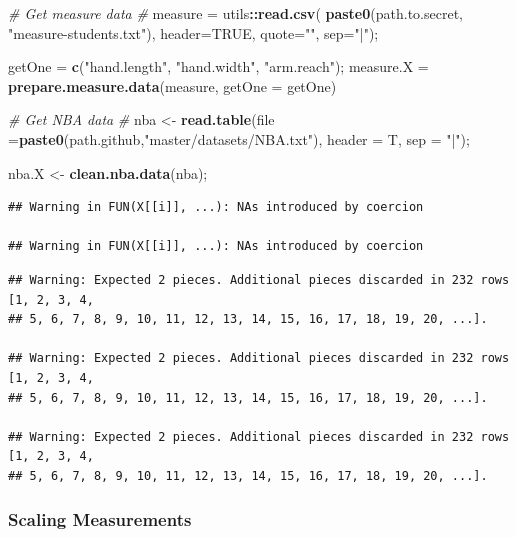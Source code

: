 \documentclass[]{article}
\newenvironment{Shaded}{\begin{snugshade}}{\end{snugshade}}
\newcommand{\CommentTok}[1]{\textcolor[rgb]{0.56,0.35,0.01}{\textit{#1}}}
\newcommand{\DataTypeTok}[1]{\textcolor[rgb]{0.13,0.29,0.53}{#1}}
\newcommand{\KeywordTok}[1]{\textcolor[rgb]{0.13,0.29,0.53}{\textbf{#1}}}
\newcommand{\NormalTok}[1]{#1}
\newcommand{\OperatorTok}[1]{\textcolor[rgb]{0.81,0.36,0.00}{\textbf{#1}}}
\newcommand{\OtherTok}[1]{\textcolor[rgb]{0.56,0.35,0.01}{#1}}
\newcommand{\StringTok}[1]{\textcolor[rgb]{0.31,0.60,0.02}{#1}}
\begin{document}
\begin{Shaded}
\begin{Highlighting}[]
\CommentTok{# Get measure data}
\CommentTok{# }
\NormalTok{measure =}\StringTok{ }\NormalTok{utils}\OperatorTok{::}\KeywordTok{read.csv}\NormalTok{( }\KeywordTok{paste0}\NormalTok{(path.to.secret, }\StringTok{"measure-students.txt"}\NormalTok{), }
                           \DataTypeTok{header=}\OtherTok{TRUE}\NormalTok{, }\DataTypeTok{quote=}\StringTok{""}\NormalTok{, }\DataTypeTok{sep=}\StringTok{"|"}\NormalTok{);}

\NormalTok{getOne =}\StringTok{ }\KeywordTok{c}\NormalTok{(}\StringTok{"hand.length"}\NormalTok{, }\StringTok{"hand.width"}\NormalTok{, }\StringTok{"arm.reach"}\NormalTok{);}
\NormalTok{measure.X =}\StringTok{ }\KeywordTok{prepare.measure.data}\NormalTok{(measure, }
                                 \DataTypeTok{getOne =}\NormalTok{ getOne)}

\CommentTok{# Get NBA data}
\CommentTok{# }
\NormalTok{nba <-}\StringTok{ }\KeywordTok{read.table}\NormalTok{(}\DataTypeTok{file =}\KeywordTok{paste0}\NormalTok{(path.github,}\StringTok{"master/datasets/NBA.txt"}\NormalTok{),}
                  \DataTypeTok{header =}\NormalTok{ T, }
                  \DataTypeTok{sep =} \StringTok{"|"}\NormalTok{);}

\NormalTok{nba.X <-}\StringTok{ }\KeywordTok{clean.nba.data}\NormalTok{(nba);}
\end{Highlighting}
\end{Shaded}

\begin{verbatim}
## Warning in FUN(X[[i]], ...): NAs introduced by coercion

## Warning in FUN(X[[i]], ...): NAs introduced by coercion
\end{verbatim}

\begin{verbatim}
## Warning: Expected 2 pieces. Additional pieces discarded in 232 rows [1, 2, 3, 4,
## 5, 6, 7, 8, 9, 10, 11, 12, 13, 14, 15, 16, 17, 18, 19, 20, ...].

## Warning: Expected 2 pieces. Additional pieces discarded in 232 rows [1, 2, 3, 4,
## 5, 6, 7, 8, 9, 10, 11, 12, 13, 14, 15, 16, 17, 18, 19, 20, ...].

## Warning: Expected 2 pieces. Additional pieces discarded in 232 rows [1, 2, 3, 4,
## 5, 6, 7, 8, 9, 10, 11, 12, 13, 14, 15, 16, 17, 18, 19, 20, ...].
\end{verbatim}

\subsubsection{Scaling Measurements}
\label{sec:appendix-scaling}
\end{document}
